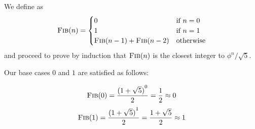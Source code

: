 \documentclass[12pt, letterpaper]{article}
\begin{document}
We define  as
\[
  \textproc{Fib}(n) = \begin{cases}
    0 & \text{if } n = 0 \\
    1 & \text{if } n = 1 \\
    \textproc{Fib}(n - 1) + \textproc{Fib}(n - 2) & \text{otherwise} \\
  \end{cases}
\]
and proceed to prove by induction that
$\textproc{Fib}(n)$ is the closest integer to $\phi^n/\sqrt{5}$.

Our base cases $0$ and $1$ are satisfied as follows:

\[ 
  \textproc{Fib}(0)
  = \frac{{(1 + \sqrt{5})}^0}{2}
  = \frac{1}{2} \approx 0
\]
\[
  \textproc{Fib}(1)
  = \frac{{(1 + \sqrt{5})}^1}{2} 
  = \frac{1 + \sqrt{5}}{2} \approx 1
\]

\end{document}
